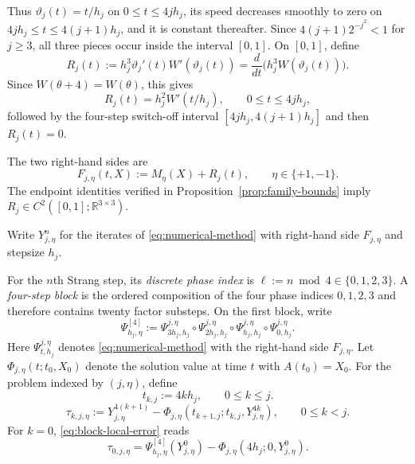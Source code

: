 \documentclass[10pt,a4paper]{amsart}
\numberwithin{equation}{section}
\newcommand{\R}{\mathbb{R}}
\begin{document}
Thus $\vartheta_j(t)=t/h_j$ on $0\le t\le4jh_j$, its speed decreases
smoothly to zero on $4jh_j\le t\le4(j+1)h_j$, and it is constant
thereafter.  Since $4(j+1)2^{-j^2}<1$ for $j\ge3$, all three pieces
occur inside the interval $[0,1]$.
On $[0,1]$, define
\begin{equation}\label{eq:R-def}
 R_j(t):=h_j^3\vartheta_j'(t)W'(\vartheta_j(t))
 =\frac{d}{dt}\bigl(h_j^3W(\vartheta_j(t))\bigr).
\end{equation}
Since $W(\theta+4)=W(\theta)$, this gives
\begin{equation}\label{eq:periodic-forcing}
 R_j(t)=h_j^2W'(t/h_j),\qquad 0\le t\le4jh_j,
\end{equation}
followed by the four-step switch-off interval
$[4jh_j,4(j+1)h_j]$ and then $R_j(t)=0$.

The two right-hand sides are
\begin{equation}\label{eq:full-field}
 F_{j,\eta}(t,X):=M_\eta(X)+R_j(t),
 \qquad \eta\in\{+1,-1\}.
\end{equation}
The endpoint identities verified in Proposition~\ref{prop:family-bounds}
imply
$R_j\in C^2([0,1];\R^{3\times3})$.

Write $Y_{j,\eta}^n$ for the iterates of \eqref{eq:numerical-method}
with right-hand side $F_{j,\eta}$ and stepsize $h_j$.

For the $n$th Strang step, its \emph{discrete phase index} is
$\ell:=n\bmod4\in\{0,1,2,3\}$.  A \emph{four-step block} is the ordered
composition of the four phase indices $0,1,2,3$ and therefore contains twenty
factor substeps.  On the first block, write
\begin{equation}\label{eq:four-step-map}
 \Psi^{[4]}_{h_j,\eta}:=
 \Psi^{j,\eta}_{3h_j,h_j}\circ
  \Psi^{j,\eta}_{2h_j,h_j}\circ
  \Psi^{j,\eta}_{h_j,h_j}\circ
  \Psi^{j,\eta}_{0,h_j}.
\end{equation}
Here $\Psi^{j,\eta}_{t,h_j}$ denotes
\eqref{eq:numerical-method} with the right-hand side $F_{j,\eta}$.
Let $\Phi_{j,\eta}(t;t_0,X_0)$ denote the solution value at time $t$ with
$A(t_0)=X_0$.  For the problem indexed by $(j,\eta)$, define
\begin{equation}\label{eq:block-objects}
 t_{k,j}:=4kh_j,
 \qquad 0\le k\le j.
\end{equation}
\begin{equation}
 \tau_{k,j,\eta}
 :=Y_{j,\eta}^{4(k+1)}
 -\Phi_{j,\eta}(t_{k+1,j};t_{k,j},Y_{j,\eta}^{4k}),
 \qquad 0\le k<j.
 \label{eq:block-local-error}
\end{equation}
For $k=0$, \eqref{eq:block-local-error} reads
\begin{equation}\label{eq:first-block-local-error}
 \tau_{0,j,\eta}
 =\Psi^{[4]}_{h_j,\eta}(Y^0_{j,\eta})
 -\Phi_{j,\eta}(4h_j;0,Y^0_{j,\eta}).
\end{equation}
\end{document}
